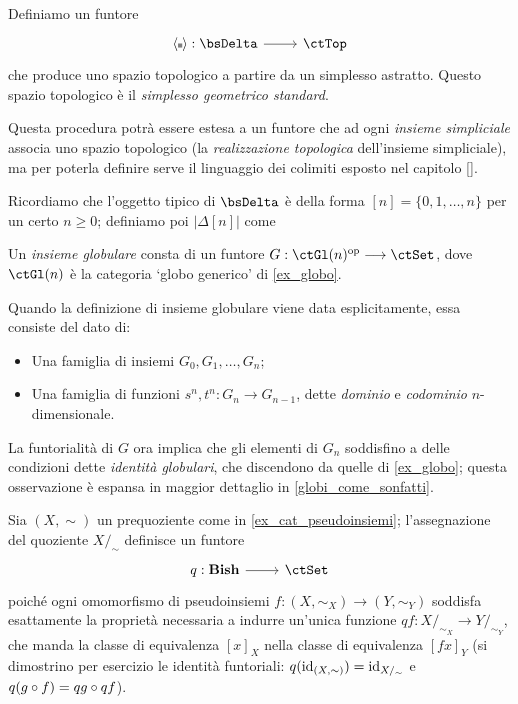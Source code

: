 \begin{definition}\label{def_real_geom}
	Definiamo un funtore 
	\[\dmFun{\bkt\blank}{\bsDelta}{\ctTop}\]
	che produce uno spazio	topologico a partire da un simplesso astratto. Questo spazio topologico è il \emph{simplesso geometrico standard}.

	Questa procedura potrà essere estesa a un funtore che ad ogni \emph{insieme simpliciale} associa uno spazio topologico (la \emph{realizzazione topologica} dell'insieme simpliciale), ma per poterla definire serve il linguaggio dei colimiti esposto nel capitolo \ref{}.

	Ricordiamo che l'oggetto tipico di $\bsDelta$	è della forma \([n]=\{0,1,\dots,n\}\) per un certo \(n\ge 0\); definiamo poi $|\Delta[n]|$ come
\end{definition}
\begin{definition}\label{def_insieme_globulare}
	Un \emph{insieme globulare} consta di un funtore \(G : \ctGl(n)^\op\fun\ctSet\), dove \(\ctGl(n)\) è la categoria `globo generico' di \ref{ex_globo}.

	Quando la definizione di insieme globulare viene data esplicitamente, essa consiste del dato di:
	\begin{itemize}
		\item Una famiglia di insiemi \(G_0,G_1,\dots,G_n\);
		\item Una famiglia di funzioni \(s^n,t^n : G_n\to G_{n-1}\), dette \emph{dominio} e \emph{codominio} \(n\)-dimensionale.
	\end{itemize}
	La funtorialità di \(G\) ora implica che gli elementi di \(G_n\) soddisfino a delle condizioni dette \emph{identità globulari}, che discendono da quelle di \ref{ex_globo}; questa osservazione è espansa in maggior dettaglio in \ref{globi_come_sonfatti}.
\end{definition}
\begin{example}
	Sia \((X,\sim)\) un prequoziente come in \ref{ex_cat_pseudoinsiemi}; l'assegnazione del quoziente \(X/_\sim\) definisce un funtore
	\[\dmFun q{\cate{Bish}}{\ctSet}\]
	poiché ogni omomorfismo di pseudoinsiemi \(f : (X,\sim_X)\to (Y,\sim_Y)\) soddisfa esattamente la proprietà necessaria a indurre un'unica funzione \(qf : X/_{\sim_X}\to Y/_{\sim_Y}\), che manda la classe di equivalenza \([x]_X\) nella classe di equivalenza \([fx]_Y\) (si dimostrino per esercizio le identità funtoriali: \(q(\mathrm{id}_{(X,\sim)})=\mathrm{id}_{X/_\sim}\) e \(q(g\circ f)=qg\circ qf\)).
\end{example}
